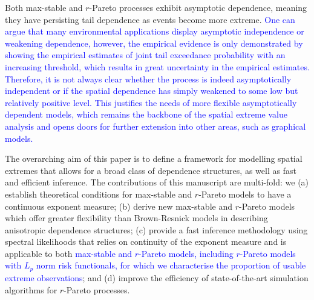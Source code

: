 \documentclass[12pt]{article}
\newcommand{\PZ}{\textcolor{blue}}
\begin{document}

Both max-stable and $r$-Pareto processes exhibit asymptotic dependence, meaning they have persisting tail dependence as events become more extreme. \PZ{One can argue that many environmental applications display asymptotic independence \citep[e.g.,][]{Bopp.etal:2021, Huser.Wadsworth:2019} or weakening dependence, however, the empirical evidence is only demonstrated by showing the empirical estimates of joint tail exceedance probability with an increasing threshold, which results in great uncertainty in the empirical estimates. Therefore, it is not always clear whether the process is indeed asymptotically independent or if the spatial dependence has simply weakened to some low but relatively positive level. This justifies the needs of more flexible asymptotically dependent models, which remains the backbone of the spatial extreme value analysis and opens doors for further extension into other areas, such as graphical models.}

The overarching aim of this paper is to define a framework for modelling spatial extremes that allows for a broad class of dependence structures, as well as fast and efficient inference. The contributions of this manuscript are multi-fold: we (a) establish theoretical conditions for max-stable and $r$-Pareto models to have a continuous exponent measure; (b) derive new max-stable and $r$-Pareto models which offer greater flexibility than Brown-Resnick models in describing anisotropic dependence structures; %
(c) provide a fast inference methodology using spectral likelihoods that relies on continuity of the exponent measure and is applicable to both \PZ{max-stable and $r$-Pareto models}\PZ{, including $r$-Pareto models with $L_p$ norm risk functionals, for which we characterise the proportion of usable extreme observations}; and (d) improve the efficiency of state-of-the-art simulation algorithms for $r$-Pareto processes.    
\end{document}
